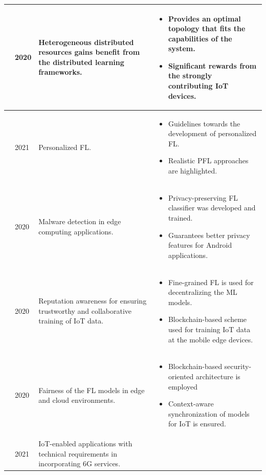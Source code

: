 \documentclass[journal]{IEEEtran}
\begin{document}
\begin{table}[!ht]
\begin{tabular}{|p{0.75cm}|p{0.5cm}|p{6.0cm}|p{9.0cm}|}
\\ \hline
\cite{rapp2020distributed}  & 2020 & Heterogeneous distributed resources gains benefit from the distributed learning frameworks. &  
\begin{itemize}
    \item Provides an optimal topology that fits the capabilities of the system.
     \item Significant rewards from the strongly contributing IoT devices. 
\end{itemize}
\\ \hline
\cite{tan2021towards}  & 2021 & Personalized FL. &  
\begin{itemize}
    \item Guidelines towards the development of personalized FL.
    \item Realistic PFL approaches are highlighted.
\end{itemize}
\\ \hline
\cite{hsu2020privacy}  & 2020 & Malware detection in edge computing applications.  &  
\begin{itemize}
    \item Privacy-preserving FL classifier was developed and trained.
    \item Guarantees better privacy features for Android applications.
\end{itemize}
\\ \hline
\cite{ur2020towards}  & 2020 & Reputation awareness for ensuring trustworthy and collaborative training of IoT data. &  
\begin{itemize}
    \item Fine-grained FL is used for decentralizing the ML models.
    \item Blockchain-based scheme used for training IoT data at the mobile edge devices. 
\end{itemize}
\\ \hline
\cite{marulli2020security}  & 2020 & Fairness of the FL models in edge and cloud environments. &  
\begin{itemize}
    \item Blockchain-based security-oriented architecture is employed 
    \item Context-aware synchronization of models for IoT is ensured.
\end{itemize}
\\ \hline
\cite{guo2021enabling}  & 2021 & IoT-enabled applications with technical requirements in incorporating 6G services. &  
\begin{itemize}

\end{itemize}
\end{tabular}
\end{table}
\end{document}

